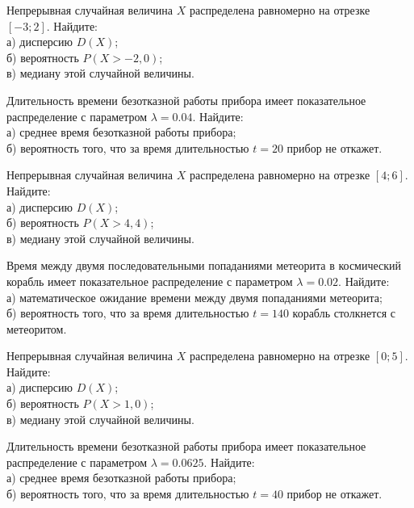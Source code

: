 \vfill

\newpage\setcounter{zad}{0}

\z Непрерывная случайная величина $X$ распределена равномерно на отрезке $[-3; 2]$. Найдите: \\ \quad а) дисперсию $D(X)$; \\ \quad б) вероятность $P(X>-2{,}0)$; \\ \quad в) медиану этой случайной величины.


\vfill

\z Длительность времени безотказной работы прибора имеет показательное распределение с параметром $\lambda = 0.04$. Найдите: \\ \quad а) среднее время безотказной работы прибора; \\ \quad б) вероятность того, что за время длительностью $t = 20$ прибор не откажет.
 

\vfill

\newpage\setcounter{zad}{0}

\z Непрерывная случайная величина $X$ распределена равномерно на отрезке $[4; 6]$. Найдите: \\ \quad а) дисперсию $D(X)$; \\ \quad б) вероятность $P(X>4{,}4)$; \\ \quad в) медиану этой случайной величины.


\vfill

\z Время между двумя последовательными попаданиями метеорита в космический корабль имеет показательное распределение с параметром $\lambda = 0.02$. Найдите: \\ \quad а) математическое ожидание времени между двумя попаданиями метеорита; \\ \quad б) вероятность того, что за время длительностью $t = 140$ корабль  столкнется с метеоритом.
 

\vfill

\newpage\setcounter{zad}{0}

\z Непрерывная случайная величина $X$ распределена равномерно на отрезке $[0; 5]$. Найдите: \\ \quad а) дисперсию $D(X)$; \\ \quad б) вероятность $P(X>1{,}0)$; \\ \quad в) медиану этой случайной величины.


\vfill

\z Длительность времени безотказной работы прибора имеет показательное распределение с параметром $\lambda = 0.0625$. Найдите: \\ \quad а) среднее время безотказной работы прибора; \\ \quad б) вероятность того, что за время длительностью $t = 40$ прибор не откажет.
 

